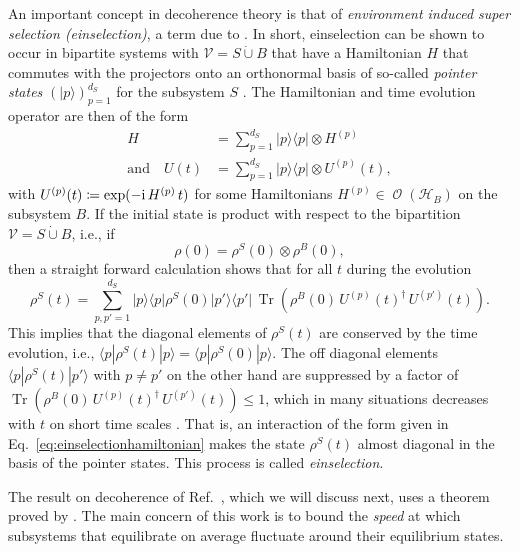 \documentclass[a4paper,12pt,listof=totoc,index=totoc,bibliography=totoc,headsepline=false,headings=normal,BCOR16.153846mm,DIV12,headinclude,twoside,cleardoublepage=empty,numbers=noenddot,final]{scrreprt}
\theoremstyle{mystyle}
\numberwithin{equation}{section}
\numberwithin{figure}{section}
\numberwithin{lemma}{section}
\numberwithin{theorem}{section}
\numberwithin{corollary}{section}
\numberwithin{definition}{section}
\numberwithin{conjecture}{section}
\numberwithin{observation}{section}
\newcommand{\+}{\mkern2mu}
\newcommand{\coloneqq}{\mathrel{\vcentcolon\mkern-1.2mu=}} %
\newcommand{\dunion}{\mathbin{\dot{\cup}}}
\newcommand{\texteqref}[1]{Eq.~\eqref{#1}}
\renewcommand{\H}{H}
\newcommand{\Vset}{\mathcal{V}}
\newcommand{\bra}[1]{\langle #1|}
\newcommand{\ket}[1]{|#1\rangle}
\newcommand{\ketbra}[2]{\ket{#1}\!\bra{#2}}
\newcommand{\ad}{^\dagger}
\renewcommand{\i}{\mathrm{i}}
\DeclareMathOperator{\1}{\mathds{1}}
\DeclareMathOperator{\Obs}{\mathcal{O}}
\DeclareMathOperator{\Tr}{Tr}
\newcommand{\mc}[1]{\mathcal{#1}}
\newcommand{\mcH}{\mc{H}}
\begin{document}
An important concept in decoherence theory is that of \emph{environment induced super selection (einselection)}, a term due to \textcite{RevModPhys.75.715}.
In short, einselection can be shown to occur in bipartite systems with $\Vset = S \dunion B$ that have a Hamiltonian $\H$ that commutes with the projectors onto an orthonormal basis of so-called \emph{pointer states} $(\ket p)_{p=1}^{d_S}$ for the subsystem $S$ \cite{PhysRevD.26.18,RevModPhys.75.715}.
The Hamiltonian and time evolution operator are then of the form
\begin{align}
  \H &= \sum_{p=1}^{d_S} \ketbra p p \otimes \H^{(p)} \label{eq:einselectionhamiltonian}\\
  \text{and}\quad U(t) &= \sum_{p=1}^{d_S} \ketbra p p \otimes U^{(p)}(t) ,
\end{align}
with $U^{(p)}(t) \coloneqq \exp(-\i\,\H^{(p)}\,t)$ for some Hamiltonians $\H^{(p)} \in \Obs(\mcH_B)$ on the subsystem $B$.
If the initial state is product with respect to the bipartition $\Vset = S \dunion B$, i.e., if
\begin{equation}
  \rho(0) = \rho^S(0) \otimes \rho^B(0) ,
\end{equation}
then a straight forward calculation shows that for all $t$ during the evolution
\begin{equation} \label{eq:timeevolvedreducedstatesundereinselectionhamiltonian}
  \rho^S(t) = \sum_{p,p'=1}^{d_S} \ketbra{p}{p} \rho^S(0) \ketbra{p'}{p'}\,\Tr(\rho^B(0)\, U^{(p)}(t)\ad\, U^{(p')}(t)) .
\end{equation}
This implies that the diagonal elements of $\rho^S(t)$ are conserved by the time evolution, i.e., $\bra{p} \rho^S(t) \ket{p} = \bra{p} \rho^S(0) \ket{p}$.
The off diagonal elements $\bra{p} \rho^S(t) \ket{p'}$ with $p\neq p'$ on the other hand are suppressed by a factor of $\Tr(\rho^B(0)\, U^{(p)}(t)\ad\, U^{(p')}(t)) \leq 1$, which in many situations decreases with $t$ on short time scales \cite{zeh96,PhysRevD.26.18,RevModPhys.75.715,Hornberger09}.
That is, an interaction of the form given in \texteqref{eq:einselectionhamiltonian} makes the state $\rho^S(t)$ almost diagonal in the basis of the pointer states.
This process is called \emph{einselection}.

The result on decoherence of Ref.~\cite{PhysRevE.81.05-1}, which we will discuss next, uses a theorem proved by \textcite{Linden10}.
The main concern of this work is to bound the \emph{speed} at which subsystems that equilibrate on average fluctuate around their equilibrium states.
\end{document}
